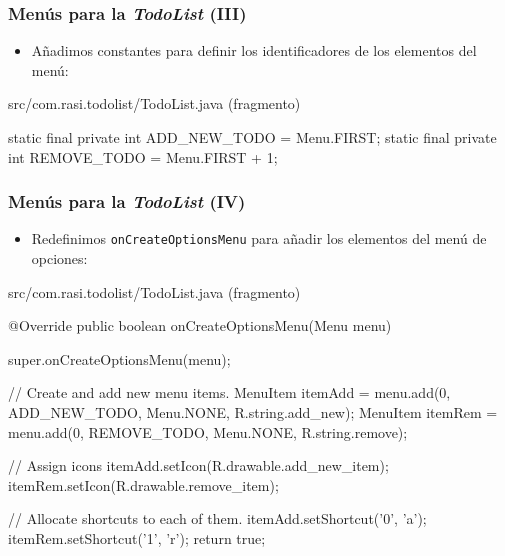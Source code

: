 \documentclass[hyperref={pdfpagelabels=true},ucs]{beamer}
\begin{document}
\begin{frame}[fragile]
\frametitle{Menús para la \emph{TodoList} (III)}

\begin{itemize}

\item Añadimos constantes para definir los identificadores de los
  elementos del menú:
\end{itemize}

\begin{tiny}
\begin{block}{src/com.rasi.todolist/TodoList.java (fragmento)}
\begin{java}
static final private int ADD_NEW_TODO = Menu.FIRST;
static final private int REMOVE_TODO = Menu.FIRST + 1;
\end{java}
\end{block}
\end{tiny}

\end{frame}


\begin{frame}[fragile]
\frametitle{Menús para la \emph{TodoList} (IV)}

\begin{itemize}
\item Redefinimos \verb|onCreateOptionsMenu| para añadir los elementos
  del menú de opciones:
\end{itemize}

\begin{tiny}
\begin{block}{src/com.rasi.todolist/TodoList.java (fragmento)}
\begin{java}
@Override
public boolean onCreateOptionsMenu(Menu menu) {
  super.onCreateOptionsMenu(menu);

  // Create and add new menu items.
  MenuItem itemAdd = menu.add(0, ADD_NEW_TODO, Menu.NONE,
                              R.string.add_new);
  MenuItem itemRem = menu.add(0, REMOVE_TODO, Menu.NONE,
                              R.string.remove);

  // Assign icons
  itemAdd.setIcon(R.drawable.add_new_item);
  itemRem.setIcon(R.drawable.remove_item);

  // Allocate shortcuts to each of them.
  itemAdd.setShortcut('0', 'a');
  itemRem.setShortcut('1', 'r');
  return true;
}
\end{java}
\end{block}
\end{tiny}

\end{frame}
\end{document}
